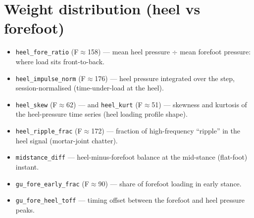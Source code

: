 \documentclass[11pt]{article}
\begin{document}
\section{Weight distribution (heel vs forefoot)}
\begin{itemize}
\item \texttt{heel\_fore\_ratio} (F$\approx$158) --- mean heel pressure $\div$ mean forefoot pressure: where load sits front-to-back.
\item \texttt{heel\_impulse\_norm} (F$\approx$176) --- heel pressure integrated over the step, session-normalised (time-under-load at the heel).
\item \texttt{heel\_skew} (F$\approx$62) --- and \texttt{heel\_kurt} (F$\approx$51) --- skewness and kurtosis of the heel-pressure time series (heel loading profile shape).
\item \texttt{heel\_ripple\_frac} (F$\approx$172) --- fraction of high-frequency ``ripple'' in the heel signal (mortar-joint chatter).
\item \texttt{midstance\_diff} --- heel-minus-forefoot balance at the mid-stance (flat-foot) instant.
\item \texttt{gu\_fore\_early\_frac} (F$\approx$90) --- share of forefoot loading in early stance.
\item \texttt{gu\_fore\_heel\_toff} --- timing offset between the forefoot and heel pressure peaks.
\end{itemize}
\end{document}
